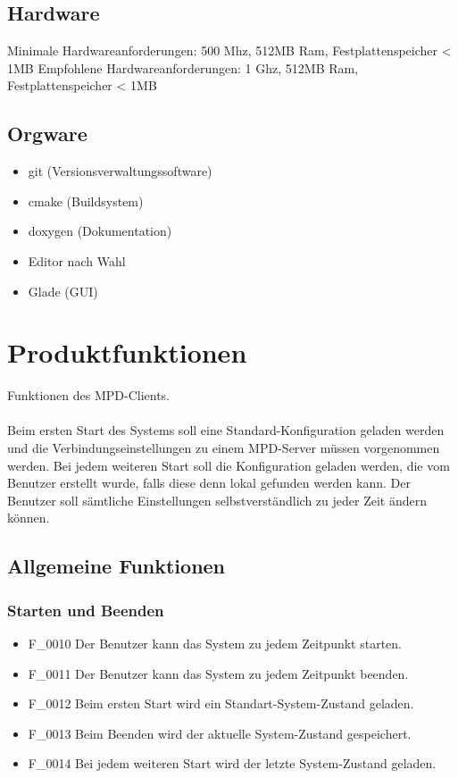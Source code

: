 \subsection{Hardware}
Minimale Hardwareanforderungen: 500 Mhz, 512MB Ram, Festplattenspeicher < 1MB
Empfohlene Hardwareanforderungen: 1 Ghz, 512MB Ram, Festplattenspeicher < 1MB
\subsection{Orgware}
\begin{itemize}
	\item git (Versionsverwaltungssoftware)
	\item cmake (Buildsystem)
	\item doxygen (Dokumentation)
	\item Editor nach Wahl
	\item Glade (GUI)
\end{itemize}
\section{Produktfunktionen}
Funktionen des MPD-Clients.\ \\ \\
Beim ersten Start des Systems soll eine Standard-Konfiguration geladen werden und die Verbindungseinstellungen
zu einem MPD-Server müssen vorgenommen werden. Bei jedem weiteren Start soll die Konfiguration geladen werden,
die vom Benutzer erstellt wurde, falls diese denn lokal gefunden werden kann. Der Benutzer soll sämtliche
Einstellungen selbstverständlich zu jeder Zeit ändern können.
\subsection{Allgemeine Funktionen}
\subsubsection{Starten und Beenden}
\begin{itemize}
	\item F\_0010 Der Benutzer kann das System zu jedem Zeitpunkt starten.
	\item F\_0011 Der Benutzer kann das System zu jedem Zeitpunkt beenden.
	\item F\_0012 Beim ersten Start wird ein Standart-System-Zustand geladen.
	\item F\_0013 Beim Beenden wird der aktuelle System-Zustand gespeichert.
	\item F\_0014 Bei jedem weiteren Start wird der letzte System-Zustand geladen.
\end{itemize}
